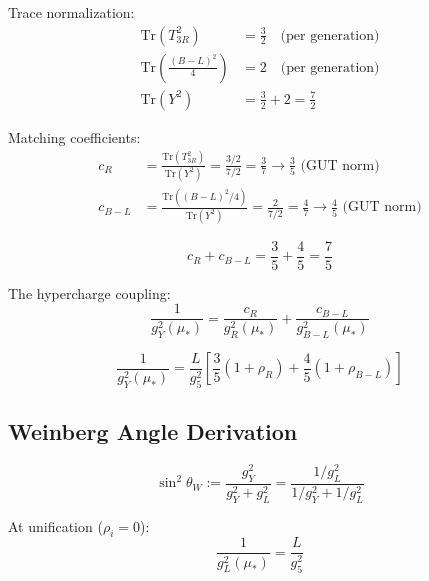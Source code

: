 \documentclass[11pt,a4paper]{article}
\theoremstyle{definition}
\begin{document}
Trace normalization:
\begin{align}
\label{eq:trace_T3R}
\text{Tr}(T_{3R}^2) &= \frac{3}{2} \quad \text{(per generation)} \\
\label{eq:trace_BL}
\text{Tr}\left(\frac{(B-L)^2}{4}\right) &= 2 \quad \text{(per generation)} \\
\label{eq:trace_Y}
\text{Tr}(Y^2) &= \frac{3}{2} + 2 = \frac{7}{2}
\end{align}

Matching coefficients:
\begin{align}
\label{eq:c_R}
c_R &= \frac{\text{Tr}(T_{3R}^2)}{\text{Tr}(Y^2)} = \frac{3/2}{7/2} = \frac{3}{7} \to \frac{3}{5} \text{ (GUT norm)} \\
\label{eq:c_BL}
c_{B-L} &= \frac{\text{Tr}((B-L)^2/4)}{\text{Tr}(Y^2)} = \frac{2}{7/2} = \frac{4}{7} \to \frac{4}{5} \text{ (GUT norm)}
\end{align}

\begin{equation}
\label{eq:c_sum}
c_R + c_{B-L} = \frac{3}{5} + \frac{4}{5} = \frac{7}{5}
\end{equation}

The hypercharge coupling:
\begin{equation}
\label{eq:gY_matching}
\frac{1}{g_Y^2(\mu_*)} = \frac{c_R}{g_R^2(\mu_*)} + \frac{c_{B-L}}{g_{B-L}^2(\mu_*)}
\end{equation}

\begin{equation}
\label{eq:gY_explicit}
\frac{1}{g_Y^2(\mu_*)} = \frac{L}{g_5^2}\left[\frac{3}{5}(1 + \rho_R) + \frac{4}{5}(1 + \rho_{B-L})\right]
\end{equation}

\subsection{Weinberg Angle Derivation}
\label{subsec:weinberg}

\begin{equation}
\label{eq:sw2_def}
\sin^2\theta_W := \frac{g_Y^2}{g_Y^2 + g_L^2} = \frac{1/g_L^2}{1/g_Y^2 + 1/g_L^2}
\end{equation}

At unification ($\rho_i = 0$):
\begin{equation}
\label{eq:gL_unified}
\frac{1}{g_L^2(\mu_*)} = \frac{L}{g_5^2}
\end{equation}
\end{document}
